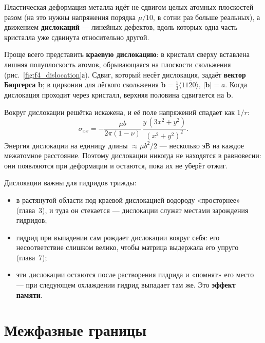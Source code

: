 Пластическая деформация металла идёт не сдвигом целых атомных плоскостей разом (на это нужны напряжения порядка
$\mu/10$, в сотни раз больше реальных), а движением \textbf{дислокаций} --- линейных дефектов, вдоль которых
одна часть кристалла уже сдвинута относительно другой.

Проще всего представить \textbf{краевую дислокацию}: в кристалл сверху вставлена лишняя полуплоскость атомов,
обрывающаяся на плоскости скольжения (рис.~\ref{fig:f4_dislocation}а). Сдвиг, который несёт дислокация, задаёт
\textbf{вектор Бюргерса} $\mathbf b$; в цирконии для лёгкого скольжения $\mathbf b = \tfrac13\langle11\bar20\rangle$,
$|\mathbf b| = a$. Когда дислокация проходит через кристалл, верхняя половина сдвигается на $\mathbf b$.


Вокруг дислокации решётка искажена, и её поле напряжений спадает как $1/r$:
\begin{equation}
\sigma_{xx} = -\frac{\mu b}{2\pi(1-\nu)}\,\frac{y\,(3x^2+y^2)}{(x^2+y^2)^2}.
\end{equation}
Энергия дислокации на единицу длины $\approx \mu b^2/2$ --- несколько эВ на каждое межатомное расстояние. Поэтому
дислокации никогда не находятся в равновесии: они появляются при деформации и остаются, пока их не уберёт отжиг.

\begin{zrbox}
Дислокации важны для гидридов трижды:
\begin{itemize}
\item в растянутой области под краевой дислокацией водороду «просторнее» (глава~3), и туда он стекается ---
  дислокации служат местами зарождения гидридов;
\item гидрид при выпадении сам рождает дислокации вокруг себя: его несоответствие слишком велико, чтобы матрица
  выдержала его упруго (глава~7);
\item эти дислокации остаются после растворения гидрида и «помнят» его место --- при следующем охлаждении гидрид
  выпадает там же. Это \textbf{эффект памяти}.
\end{itemize}
\end{zrbox}

\section{Межфазные границы}

